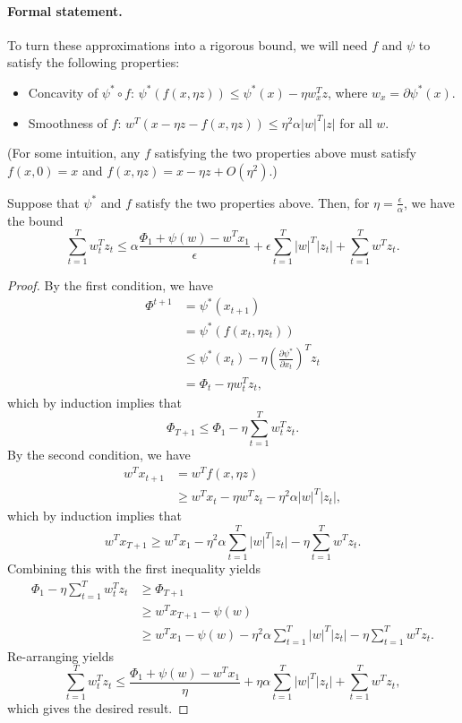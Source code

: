 \documentclass[11pt]{article}
\begin{document}
\paragraph{Formal statement.} To turn these approximations into a rigorous bound, we will 
need $f$ and $\psi$ to satisfy the following properties:
\begin{itemize}
\item Concavity of $\psi^* \circ f$: $\psi^*(f(x,\eta z)) \leq \psi^*(x) - \eta w_x^Tz$, where $w_x = \partial \psi^*(x)$.
\item Smoothness of $f$: $w^T(x-\eta z - f(x,\eta z)) \leq \eta^2 \alpha |w|^T|z|$ for all $w$.
\end{itemize}
(For some intuition, any $f$ satisfying the two properties above 
must satisfy $f(x,0) = x$ and $f(x,\eta z) = x-\eta z + O(\eta^2)$.)
\begin{theorem}
\label{thm:main}
Suppose that $\psi^*$ and $f$ satisfy the two properties above. Then, 
for $\eta = \frac{\epsilon}{\alpha}$, we have the bound
\[ \sum_{t=1}^T w_t^Tz_t \leq \alpha \frac{\Phi_1 + \psi(w) - w^Tx_1}{\epsilon} + \epsilon \sum_{t=1}^T |w|^T|z_t| + \sum_{t=1}^T w^Tz_t. \]
\end{theorem}
\begin{proof}
By the first condition, we have
\begin{align*}
\Phi^{t+1} &= \psi^*(x_{t+1}) \\
 &= \psi^*(f(x_t, \eta z_t)) \\
 &\leq \psi^*(x_t) - \eta \left(\frac{\partial \psi^*}{\partial x_t}\right)^T z_t \\
 &= \Phi_t - \eta w_t^T z_t,
\end{align*}
which by induction implies that
\[ \Phi_{T+1} \leq \Phi_1 - \eta \sum_{t=1}^T w_t^Tz_t. \]
By the second condition, we have
\begin{align*}
w^Tx_{t+1} &= w^Tf(x, \eta z) \\
 &\geq w^Tx_t - \eta w^Tz_t - \eta^2 \alpha |w|^T|z_t|,
\end{align*}
which by induction implies that
\[ w^Tx_{T+1} \geq w^Tx_1 - \eta^2\alpha \sum_{t=1}^T |w|^T|z_t| - \eta \sum_{t=1}^T w^Tz_t. \]
Combining this with the first inequality yields
\begin{align*}
\Phi_1 - \eta \sum_{t=1}^T w_t^Tz_t &\geq \Phi_{T+1} \\
 &\geq w^Tx_{T+1} - \psi(w) \\
 &\geq w^Tx_1 - \psi(w) - \eta^2\alpha \sum_{t=1}^T |w|^T|z_t| - \eta \sum_{t=1}^T w^Tz_t.
\end{align*}
Re-arranging yields
\[ \sum_{t=1}^T w_t^Tz_t \leq \frac{\Phi_1 + \psi(w) - w^Tx_1}{\eta} + \eta\alpha \sum_{t=1}^T |w|^T|z_t| + \sum_{t=1}^T w^Tz_t, \]
which gives the desired result.
\end{proof}
\end{document}
